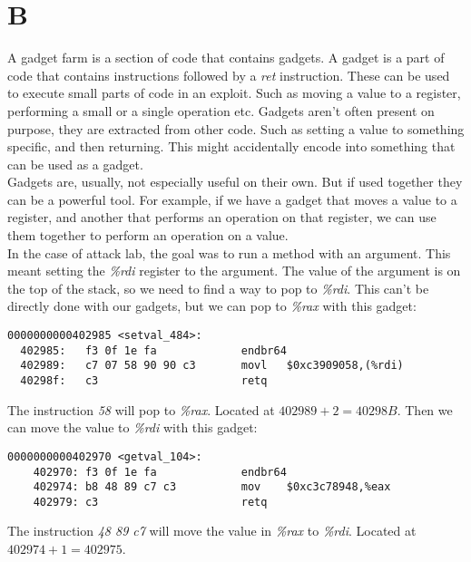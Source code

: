 \documentclass[11pt]{report}
\begin{document}
\section{B}
A gadget farm is a section of code that contains gadgets. A gadget is a part of code that contains instructions followed by a \textit{ret} instruction. These can be used to execute small parts of code in an exploit. Such as moving a value to a register, performing a small or a single operation etc. Gadgets aren't often present on purpose, they are extracted from other code. Such as setting a value to something specific,  and then returning. This might accidentally encode into something that can be used as a gadget.\\

Gadgets are, usually, not especially useful on their own. But if used together they can be a powerful tool. For example, if we have a gadget that moves a value to a register, and another that performs an operation on that register, we can use them together to perform an operation on a value.\\[1ex]

In the case of attack lab, the goal was to run a method with an argument. This meant setting the \textit{\%rdi} register to the argument. The value of the argument is on the top of the stack, so we need to find a way to pop to \textit{\%rdi}. This can't be directly done with our gadgets, but we can pop to \textit{\%rax} with this gadget:
\begin{lstlisting}[language={[x86masm]Assembler}]
0000000000402985 <setval_484>:
  402985:	f3 0f 1e fa          	endbr64 
  402989:	c7 07 58 90 90 c3    	movl   $0xc3909058,(%rdi)
  40298f:	c3                   	retq   
\end{lstlisting}
The instruction \textit{58} will pop to \textit{\%rax}. Located at $402989 + 2 = 40298B$. Then we can move the value to \textit{\%rdi} with this gadget:
\begin{lstlisting}[language={[x86masm]Assembler}]
0000000000402970 <getval_104>:
    402970:	f3 0f 1e fa          	endbr64 
    402974:	b8 48 89 c7 c3       	mov    $0xc3c78948,%eax
    402979:	c3                   	retq   
\end{lstlisting}
The instruction \textit{48 89 c7} will move the value in \textit{\%rax} to \textit{\%rdi}. Located at $402974 + 1 = 402975$.\\[1ex] 
\end{document}
